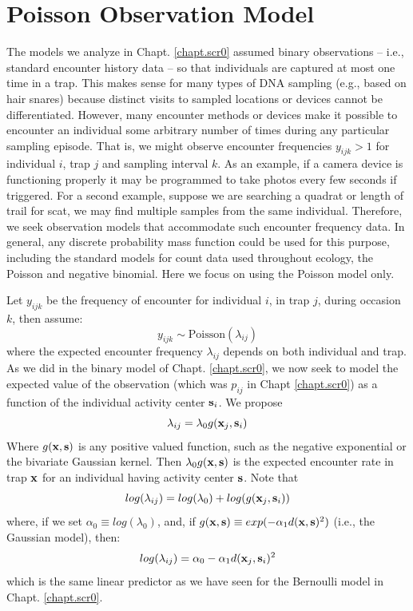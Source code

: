 \section{Poisson Observation Model}

The models we analyze in Chapt. \ref{chapt.scr0} assumed binary
observations -- i.e., standard encounter history data -- so
that individuals are captured at most one time in a trap.  This makes
sense for many types of DNA sampling (e.g., based on hair snares)
because distinct visits to sampled locations or devices cannot be
differentiated. However, many encounter methods or devices make it
possible to encounter an individual some arbitrary number of times
during any particular sampling episode. That is, we might observe
encounter frequencies $y_{ijk}>1$
for individual $i$, trap $j$ and
sampling interval $k$.  As an example, if a camera device is
functioning properly it may be programmed to take photos every few
seconds if triggered.  For a second example, suppose we are searching
a quadrat or length of trail for scat, we may find multiple samples from the same
individual.
Therefore, we seek observation models that accommodate such encounter
frequency data.  In general, any discrete probability mass function
could be used for this purpose, including the standard models for
count data used throughout ecology, the Poisson and negative
binomial.  Here we focus on using the Poisson
model only.

Let $y_{ijk}$ be the frequency of encounter for
individual $i$, in trap $j$, during occasion $k$, then assume:
\[
 y_{ijk} \sim \mbox{Poisson}(\lambda_{ij})
\]
where the expected encounter frequency $\lambda_{ij}$ depends on both
individual and trap. As we did in the binary model of
Chapt. \ref{chapt.scr0}, we
now seek to model the expected value of the observation (which was
$p_{ij}$ in Chapt \ref{chapt.scr0}) as a function of the individual activity center
${\bf s}_{i}$.
We propose
\[
 \lambda_{ij} = \lambda_{0}  g({\bf x}_{j},{\bf s}_{i})
\]
Where $g({\bf x},{\bf s})$ is any positive valued function, such as
the negative exponential or the bivariate Gaussian kernel.
Then $\lambda_{0}g({\bf x},{\bf s})$ is the expected encounter rate in trap
${\bf x}$ for an individual having activity center ${\bf s}$.  Note
that
\[
 log(\lambda_{ij}) = log(\lambda_{0}) + log(  g({\bf x}_{j},{\bf
   s}_{i}) )
\]
where, if we set $\alpha_{0} \equiv log(\lambda_{0})$, and, if 
$g({\bf x},{\bf s}) \equiv exp(-\alpha_{1} d({\bf x},{\bf s})^2)$
(i.e., the Gaussian model), then:
\begin{equation}
 log(\lambda_{ij}) = \alpha_{0} - \alpha_{1} d({\bf x}_{j},{\bf s}_{i})^{2}
\label{poisson-mn.eq.lp}
\end{equation}
which is the same linear predictor as we have seen for the Bernoulli
model in Chapt. \ref{chapt.scr0}. 

